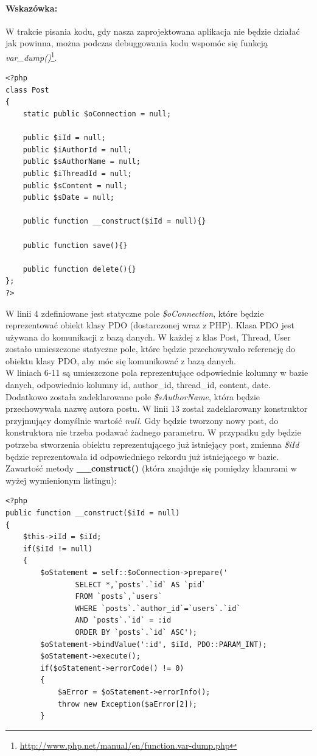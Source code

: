 \documentclass[a4paper,10pt]{article}
\begin{document}
\paragraph{Wskazówka:} W trakcie pisania kodu, gdy nasza zaprojektowana aplikacja nie będzie działać jak powinna, można podczas debuggowania kodu wspomóc się funkcją  \textit{var\_dump()}\footnote{\href{http://www.php.net/manual/en/function.var-dump.php}{http://www.php.net/manual/en/function.var-dump.php}}.
\\
\begin{verbatim}
<?php
class Post
{
	static public $oConnection = null;

	public $iId = null;
	public $iAuthorId = null;
	public $sAuthorName = null;
	public $iThreadId = null;
	public $sContent = null;
	public $sDate = null;
	
	public function __construct($iId = null){}
	
	public function save(){}

	public function delete(){}
};
?>
\end{verbatim}
W linii 4 zdefiniowane jest statyczne pole \textit{\$oConnection}, które będzie reprezentować obiekt klasy PDO (dostarczonej wraz z PHP). Klasa PDO jest używana do komunikacji z bazą danych. W każdej z klas Post, Thread, User zostało umieszczone statyczne pole, które będzie przechowywało referencję do obiektu klasy PDO, aby móc się komunikować z bazą danych. \\
W liniach 6-11 są umieszczone pola reprezentujące odpowiednie kolumny w bazie danych, odpowiednio kolumny id, author\_id, thread\_id, content, date. Dodatkowo została zadeklarowane pole \textit{\$sAuthorName}, która będzie przechowywała nazwę autora postu. W linii 13 został zadeklarowany konstruktor przyjmujący domyślnie wartość \textit{null}. Gdy będzie tworzony nowy post, do konstruktora nie trzeba podawać żadnego parametru. W przypadku gdy będzie potrzeba stworzenia obiektu reprezentującego już istniejący post, zmienna \textit{\$iId} będzie reprezentowała id odpowiedniego rekordu już istniejącego w bazie. \\
Zawartość metody \textbf{\_\_construct()} (która znajduje się pomiędzy klamrami w wyżej wymienionym listingu): \\
\begin{verbatim}
<?php
public function __construct($iId = null)
{
	$this->iId = $iId;
	if($iId != null)
	{
		$oStatement = self::$oConnection->prepare('
				SELECT *,`posts`.`id` AS `pid` 
				FROM `posts`,`users`
				WHERE `posts`.`author_id`=`users`.`id`
				AND `posts`.`id` = :id
				ORDER BY `posts`.`id` ASC');
		$oStatement->bindValue(':id', $iId, PDO::PARAM_INT);
		$oStatement->execute();
		if($oStatement->errorCode() != 0)
		{
			$aError = $oStatement->errorInfo();
			throw new Exception($aError[2]);
		}
\end{verbatim}
\end{document}
